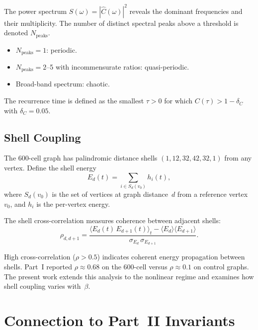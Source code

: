 \documentclass[12pt,a4paper]{article}
\begin{document}
The power spectrum $S(\omega) = |\hat{C}(\omega)|^2$ reveals the
dominant frequencies and their multiplicity.  The number of distinct
spectral peaks above a threshold is denoted $N_{\mathrm{peaks}}$.

\begin{itemize}[nosep]
\item $N_{\mathrm{peaks}} = 1$: periodic.
\item $N_{\mathrm{peaks}} = 2$--5 with incommensurate ratios:
  quasi-periodic.
\item Broad-band spectrum: chaotic.
\end{itemize}

The recurrence time is defined as the smallest $\tau > 0$ for which
$C(\tau) > 1 - \delta_C$ with $\delta_C = 0.05$.

\subsection{Shell Coupling}\label{sec:shell}

The 600-cell graph has palindromic distance shells
$(1, 12, 32, 42, 32, 1)$ from any vertex.  Define the shell energy
\begin{equation}\label{eq:shell_energy}
  E_d(t) = \sum_{i \in S_d(v_0)} h_i(t),
\end{equation}
where $S_d(v_0)$ is the set of vertices at graph distance~$d$ from a
reference vertex~$v_0$, and $h_i$ is the per-vertex energy.

The shell cross-correlation measures coherence between adjacent shells:
\begin{equation}\label{eq:shell_corr}
  \rho_{d,d+1}
  = \frac{\langle E_d(t) \, E_{d+1}(t) \rangle_t
    - \langle E_d \rangle \langle E_{d+1} \rangle}
    {\sigma_{E_d} \, \sigma_{E_{d+1}}}.
\end{equation}

High cross-correlation ($\rho > 0.5$) indicates coherent energy
propagation between shells.  Part~I reported $\rho \approx 0.68$ on
the 600-cell versus $\rho \approx 0.1$ on control graphs.  The
present work extends this analysis to the nonlinear regime and
examines how shell coupling varies with~$\beta$.


\section{Connection to Part~II Invariants}\label{sec:invariants}
\end{document}
